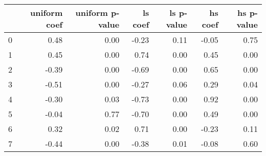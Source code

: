 \begin{tabular}{lrrrrrr}
\toprule
 & uniform coef & uniform p-value & ls coef & ls p-value & hs coef & hs p-value \\
\midrule
0 & 0.48 & 0.00 & -0.23 & 0.11 & -0.05 & 0.75 \\
1 & 0.45 & 0.00 & 0.74 & 0.00 & 0.45 & 0.00 \\
2 & -0.39 & 0.00 & -0.69 & 0.00 & 0.65 & 0.00 \\
3 & -0.51 & 0.00 & -0.27 & 0.06 & 0.29 & 0.04 \\
4 & -0.30 & 0.03 & -0.73 & 0.00 & 0.92 & 0.00 \\
5 & -0.04 & 0.77 & -0.70 & 0.00 & 0.49 & 0.00 \\
6 & 0.32 & 0.02 & 0.71 & 0.00 & -0.23 & 0.11 \\
7 & -0.44 & 0.00 & -0.38 & 0.01 & -0.08 & 0.60 \\
\bottomrule
\end{tabular}
